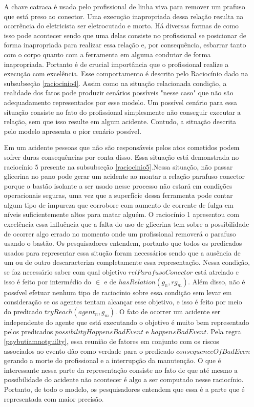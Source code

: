 A chave catraca é usada pelo profissional de linha viva para remover um prafuso que está preso ao conector. Uma execução inapropriada dessa relação resulta 
na ocorrência do eletricista ser eletrocutado e morto. Há diversas formas de como isso pode acontecer sendo que uma delas consiste no profissional se 
posicionar de forma inapropriada para realizar essa relação e, por consequência, esbarrar tanto com o corpo quanto com a ferramenta em alguma condutor 
de forma inapropriada. Portanto é de crucial importância que o profissional realize a execução com excelência. Esse comportamento é descrito pelo 
Raciocínio dado na subsubseção \ref{raciocinio4}. Assim como na situação relacionada condição, a realidade dos fatos pode produzir cenários possíveis "nesse caso" que não são 
adequadamento representados por esse modelo. Um possível cenário para essa situação consiste no fato do profissional simplesmente não conseguir executar 
a relação, sem que isso resulte em algum acidente. Contudo, a situação descrita pelo modelo apresenta o pior cenário possível. 

Em um acidente pessoas que não são responsáveis pelos atos cometidos podem sofrer duras consequências por conta disso. Essa situação está demonstrada no 
raciocínio 5 presente na subsubseção \ref{raciocinio5}.Nessa situação, não passar glicerina no pano pode gerar um acidente ao montar a relação parafuso 
conector porque o bastão isolante a ser usado nesse  processo não estará em condições operacionais seguras, uma vez que a superfície dessa ferramenta pode 
contar algum tipo de impureza que corrobore com aumento de corrente de fulga em níveis suficientemente altos para matar alguém. O raciocínio 1 apresentou
com excelência essa influência que a falta do uso de glicerina tem sobre a possibilidade de ocorrer algo errado no momento onde um profissional 
removerá o parafuso usando o bastão. Os pesquisadores entendem, portanto que todos os predicados usados para representar essa situção foram necessários 
sendo que a ausência de um ou de outro descaracteriza completamente essa representação. Nessa condição, se faz necessário saber com qual objetivo 
$relParafusoConector$ está atrelado e isso é feito por intermédio do $\in$ e de $hasRelation(g_n,rg_m)$. Além disso, não é possível efetuar nenhum 
tipo de raciocínio sobre essa condição sem levar em consideração se os agentes tentam alcançar esse objetivo, e isso é feito por meio do predicado 
$tryReach(agent_n,g_m)$. O fato de ocorrer um acidente ser independente do agente que está executando o objetivo é muito bem representado pelos predicados 
$possibilityHappensBadEvent$ e $happensBadEvent$. Pela regra \ref{paybutiamnotguilty}, essa reunião de fatores em conjunto com os riscos associados 
ao evento dão como verdade para o predicado $consequenceOfBadEven$ gerando a morte do profissional e a interrupção da manutenção. O que é interessante nessa parte da representação consiste no fato de que até mesmo a possibilidade do acidente não acontecer 
é algo a ser computado nesse raciocínio. Portanto, de todo o modelo, os pesquisadores entendem que essa é a parte que é representada com maior precisão. 

